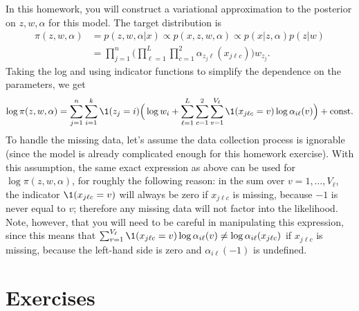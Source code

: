 \documentclass[12pt]{article}
\begin{document}
In this homework, you will construct a variational approximation to the posterior on $z,w,\alpha$ for this model. The target distribution is
\begin{align*}
\pi(z,w,\alpha) &= p(z,w,\alpha | x) \propto p(x,z,w,\alpha)
\propto p(x | z,\alpha) p(z | w)\\
& = \prod_{j = 1}^n \Big(\prod_{\ell = 1}^L \prod_{c = 1}^2 
\alpha_{z_j \ell}(x_{j \ell c}) \Big) w_{z_j}.
\end{align*}
Taking the log and using indicator functions to simplify the dependence on the parameters, we get
\begin{align*}
\log \pi(z,w,\alpha) = \sum_{j = 1}^n \sum_{i = 1}^k
\1(z_j = i) \Big(\log w_i + \sum_{\ell = 1}^L \sum_{c = 1}^2 \sum_{v = 1}^{V_\ell} \1(x_{j \ell c} = v) \log \alpha_{i \ell}(v)\Big) + \text{const}.
\end{align*}
To handle the missing data, let's assume the data collection process is ignorable (since the model is already complicated enough for this homework exercise).  With this assumption, the same exact expression as above can be used for $\log \pi(z,w,\alpha)$, for roughly the following reason:  in the sum over $v= 1,\ldots,V_\ell$, the indicator $\1(x_{j \ell c} = v)$ will always be zero if $x_{j \ell c}$ is missing, because $-1$ is never equal to $v$; therefore any missing data will not factor into the likelihood. Note, however, that you will need to be careful in manipulating this expression, since this means that
$ \sum_{v = 1}^{V_\ell} \1(x_{j \ell c} = v) \log \alpha_{i \ell}(v) \neq \log \alpha_{i \ell}(x_{j \ell c}) $
if $x_{j \ell c}$ is missing, because the left-hand side is zero and $\alpha_{i \ell}(-1)$ is undefined.

\section{Exercises}
\end{document}
